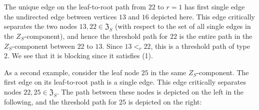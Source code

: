 \begin{example}
\begin{center}
    \end{center}
    The unique edge on the leaf-to-root path from $22$ to $r = 1$ has first single edge the undirected edge between vertices $13$ and $16$ depicted here.  
    This edge critically separates the two nodes $13, 22\in\mathfrak{Z}_S$ (with respect to the set of all single edges in the $Z_S$-component), and hence the threshold path for $22$ is the entire path in the $Z_S$-component between $22$ to $13$. 
    Since $13 <_r 22$, this is a threshold path of type 2. 
    We see that it is blocking since it satisfies (1).  

    As a second example, consider the leaf node $25$ in the same $Z_S$-component.  The first edge on its leaf-to-root path is a single edge.  This edge critically separates nodes $22, 25\in\mathfrak{Z}_S$.  The path between these nodes is depicted on the left in the following, and the threshold path for $25$ is depicted on the right:
    \begin{center}
\end{center}
\end{example}
